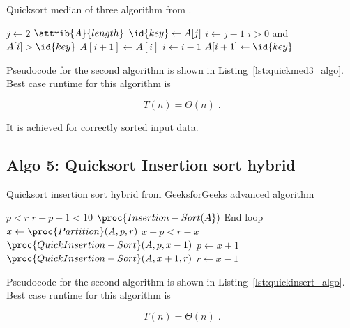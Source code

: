 \documentclass[twocolumn, sigconf, nonacm, natbib, screen, balance=False]{acmart}
\begin{document}
\begin{listing}
  \caption{Quicksort median of three algorithm from \citet[Ch.~2.1]{CLRS_2009}.}
  \label{lst:quickmed3_algo}
  \begin{codebox}
    \li \For $j \gets 2$ \To $\attrib{A}{length}$
    \li \Do
    $\id{key} \gets A[j]$
    \li     $i \gets j-1$
    \li      \While $i>0$ and $A[i] > \id{key}$
    \li      \Do
    $A[i+1] \gets A[i]$
    \li         $i \gets i-1$
    \End    
    \li       $A[i+1]\gets \id{key}$
    \End
  \end{codebox}
\end{listing}

Pseudocode for the second algorithm is shown in
Listing~\ref{lst:quickmed3_algo}. Best case runtime for this algorithm
is

\begin{equation}
  T(n) = \Theta(n) \;.  \label{eq:ins_sort_best}
\end{equation}

It is achieved for correctly sorted input data.

\subsection{Algo 5: Quicksort Insertion sort hybrid}\label{sec:algo5}

\begin{listing}
  \caption{Quicksort insertion sort hybrid from GeeksforGeeks advanced algorithm}
  \label{lst:quickinsert_algo}
  \begin{codebox}
    \li \While $p<r$
    \li	\Do \If $r-p+1<10$
    \li		\Do $\proc{Insertion-Sort(A})$
    \li			End loop
    \li 	\Else
    \li			$x \gets \proc{Partition}(A, p, r)$
    \li 	\If $x-p<r-x$
    \li		\Do $\proc{QuickInsertion-Sort}(A, p, x-1)$
    \li 	$p \gets x+1$
    \li 	\Else
    \li 	$\proc{QuickInsertion-Sort}(A, x+1, r)$
    \li 	$r \gets x-1$
    \End
    \End
    \End
  \end{codebox}
\end{listing}

Pseudocode for the second algorithm is shown in
Listing~\ref{lst:quickinsert_algo}. Best case runtime for this algorithm
is

\begin{equation}
  T(n) = \Theta(n) \;.  \label{eq:ins_sort_best}
\end{equation}
\end{document}
